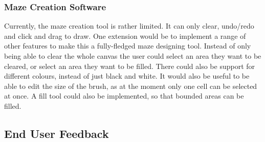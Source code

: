 \documentclass[titlepage]{article}
\begin{document}
\subsubsection{Maze Creation Software}
Currently, the maze creation tool is rather limited. It can only clear, undo/redo and click and drag to draw. One extension would be to implement a range of other features to make this a fully-fledged maze designing tool. Instead of only being able to clear the whole canvas the user could select an area they want to be cleared, or select an area they want to be filled. There could also be support for different colours, instead of just black and white. It would also be useful to be able to edit the size of the brush, as at the moment only one cell can be selected at once. A fill tool could also be implemented, so that bounded areas can be filled. 

\subsection{End User Feedback}
\end{document}
